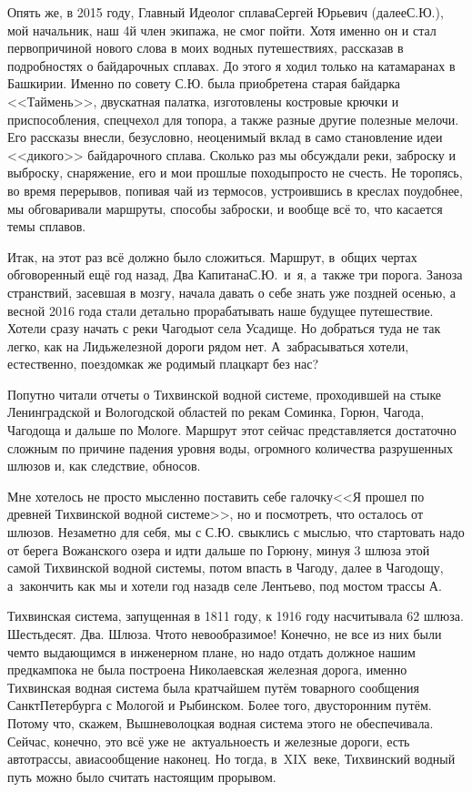 Опять же, в 2015 году, Главный Идеолог сплава\mdash Сергей Юрьевич (далее\mdash С.Ю.), мой начальник, наш 4\sdash й член экипажа, не смог пойти. Хотя именно он и стал первопричиной нового слова в моих водных путешествиях, рассказав в подробностях о байдарочных сплавах. До этого я ходил только на катамаранах в Башкирии. Именно по совету С.Ю. была приобретена старая байдарка <<Таймень>>, двускатная палатка, изготовлены костровые крючки и приспособления, спецчехол для топора, а также разные другие полезные мелочи. Его рассказы внесли, безусловно, неоценимый вклад в само становление идеи <<дикого>> байдарочного сплава. Сколько раз мы обсуждали реки, заброску и выброску, снаряжение, его и мои прошлые походы\mdash просто не счесть. Не торопясь, во время перерывов, попивая чай из термосов, устроившись в креслах поудобнее, мы обговаривали маршруты, способы заброски, и вообще всё то, что касается темы сплавов.

Итак, на этот раз всё должно было сложиться. Маршрут, в~общих чертах обговоренный ещё год назад, Два Капитана\mdash С.Ю.~и~я, а~также три порога. Заноза странствий, засевшая в мозгу, начала давать о себе знать уже поздней осенью, а весной 2016 года стали детально прорабатывать наше будущее путешествие. Хотели сразу начать с реки Чагоды\mdash от села Усадище. Но добраться туда не так легко, как на Лидь\mdash железной дороги рядом нет. А~забрасываться хотели, естественно, поездом\mdash как же родимый плацкарт без нас? 

Попутно читали отчеты о Тихвинской водной системе, проходившей на стыке Ленинградской и Вологодской областей по рекам Соминка, Горюн, Чагода, Чагодоща и дальше по Мологе. Маршрут этот сейчас представляется достаточно сложным по причине падения уровня воды, огромного количества разрушенных шлюзов и, как следствие, обносов. 

Мне хотелось не просто мысленно поставить себе галочку\mdash <<Я прошел по древней Тихвинской водной системе>>, но и посмотреть, что осталось от шлюзов. Незаметно для себя, мы с С.Ю. свыклись с мыслью, что стартовать надо от берега Вожанского озера и идти дальше по Горюну, минуя 3 шлюза этой самой Тихвинской водной системы, потом впасть в Чагоду, далее в Чагодощу, а~закончить как мы и хотели год назад\mdash в селе Лентьево, под мостом трассы А.

\newpage
Тихвинская система, запущенная в 1811 году, к 1916 году насчитывала 62 шлюза. Шестьдесят. Два. Шлюза. Что\sdash то невообразимое! Конечно, не все из них были чем\sdash то выдающимся в инженерном плане, но надо отдать должное нашим предкам\mdash пока не была построена Николаевская железная дорога, именно Тихвинская водная система была кратчайшем путём товарного сообщения Санкт\sdash Петербурга с Мологой и Рыбинском. Более того, двусторонним путём. Потому что, скажем, Вышневолоцкая водная система этого не обеспечивала. Сейчас, конечно, это всё уже не~актуально\mdash есть и железные дороги, есть автотрассы, авиасообщение наконец. Но тогда, в~XIX~веке, Тихвинский водный путь можно было считать настоящим прорывом. 

